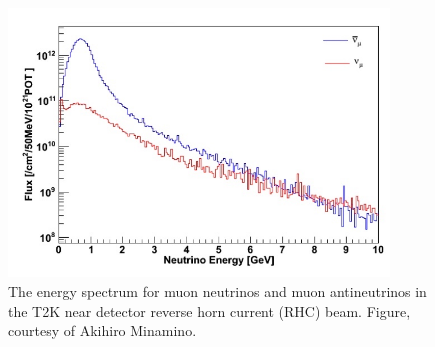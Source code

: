 



\begin{figure}[h!]
\centering
\includegraphics[width=0.9\textwidth]{figures/WAGASCIflux.jpeg}
\caption{The energy spectrum for muon neutrinos and muon antineutrinos in the T2K near detector reverse horn current (RHC) beam. Figure, courtesy of Akihiro Minamino.}
\label{fig:T2KndSpectrum}
\end{figure}

